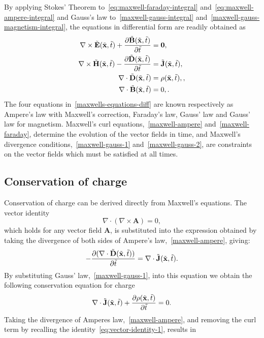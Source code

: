 By applying Stokes' Theorem to~\eqref{eq:maxwell-faraday-integral} and~\eqref{eq:maxwell-ampere-integral} and Gauss's law to~\eqref{maxwell-gauss-integral} and~\eqref{maxwell-gauss-magnetism-integral}, the equations in differential form are readily obtained as
\begin{subequations}
\label{maxwells-equations-diff}
\begin{align}
    \nabla \times \tilde{\mathbf{E}}(\tilde{\mathbf{x}},\tilde{t}) + \frac{\partial\tilde{\mathbf{B}}(\tilde{\mathbf{x}}, \tilde{t})}{\partial \tilde{t}}&= \mathbf{0}, \label{maxwell-faraday} \\
    \nabla \times \tilde{\mathbf{H}}(\tilde{\mathbf{x}},\tilde{t}) - \frac{\partial\tilde{\mathbf{D}}(\tilde{\mathbf{x}}, \tilde{t})}{\partial \tilde{t}}&= \tilde{\mathbf{J}}(\tilde{\mathbf{x}},\tilde{t}), \label{maxwell-ampere} \\
    \nabla \cdot \tilde{\mathbf{D}} (\tilde{\mathbf{x}},\tilde{t}) &= \rho(\tilde{\mathbf{x}},\tilde{t}), \label{maxwell-gauss-1}, \\
    \nabla \cdot \tilde{\mathbf{B}} (\tilde{\mathbf{x}},\tilde{t}) &= 0, \label{maxwell-gauss-2} .
\end{align}
\end{subequations}
The four equations in~\eqref{maxwells-equations-diff} are known respectively as Ampere's law with Maxwell's correction, Faraday's law, Gauss' law and Gauss' law for magnetism. Maxwell's curl equations,~\eqref{maxwell-ampere} and~\eqref{maxwell-faraday}, determine the evolution of the vector fields in time, and Maxwell's divergence conditions,~\eqref{maxwell-gauss-1} and~\eqref{maxwell-gauss-2}, are constraints on the vector fields which must be satisfied at all times.

\subsection{Conservation of charge}

Conservation of charge can be derived directly from Maxwell's equations. The vector identity
\begin{equation}
\label{eq:vector-identity-1}
\nabla \cdot ( \nabla \times \mathbf{A} ) = 0,
\end{equation}
which holds for any vector field $\mathbf{A}$, is substituted into the expression obtained by taking the divergence of both sides of Ampere's law,~\eqref{maxwell-ampere}, giving:
$$
- \frac{\partial( \nabla \cdot \tilde{\mathbf{D}}(\tilde{\mathbf{x}},\tilde{t}) ) }{\partial \tilde{t}} = \nabla \cdot \tilde{\mathbf{J}}(\tilde{\mathbf{x}},\tilde{t}) .
$$
By substituting Gauss' law,~\eqref{maxwell-gauss-1}, into this equation we obtain the following conservation equation for charge
\begin{equation}
\label{eq:maxwell-charge-conservation-2}
\nabla \cdot \tilde{\mathbf{J}}(\tilde{\mathbf{x}},\tilde{t}) + \frac{\partial\rho (\tilde{\mathbf{x}},\tilde{t}) }{\partial \tilde{t}} = 0 .
\end{equation}
Taking the divergence of Amperes law,~\eqref{maxwell-ampere}, and removing the curl term by recalling the identity~\eqref{eq:vector-identity-1}, results in

